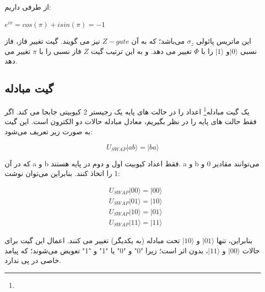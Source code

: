 \documentclass{book}
\begin{document}
از طرفی داریم:
\begin{center}
	$e^{i\pi} =  cos(\pi) + isin(\pi)= -1$
\end{center}
 این ماتریس پائولی $ \sigma_{z}$ می‌باشد؛ که به آن $ Z-gate$ نیز می گویند. گیت تغییر فاز، فاز نسبی
 $\vert 0 \rangle$و $\vert 1 \rangle$ را با $Φ$ تغییر می دهد. و به این ترتیب گیت $Z$ فاز نسبی را با $\pi$ تغییر می دهد. 
 
 
 
\subsection{گیت مبادله}
یک گیت مبادله\footnote{} اعداد را در حالت های پایه یک رجیستر 2 کیوبیتی جابجا می کند. اگر فقط حالت های پایه را در نظر بگیریم، معادل مبادله حالات دو الکترون است. این گیت به صورت  زیر تعریف می‌شود:
\begin{center}
\begin{equation}
	U_{SWAP}   \vert ab\rangle = \vert ba \rangle
\end{equation}
\end{center}
که در آن a و b فقط اعداد کیوبیت اول و دوم در پایه هستند. a و b می‌توانند مقادیر 0 و 1 را اتخاذ کنند. بنابراین می‌توان نوشت:
\begin{center}
	$$\begin{aligned}
		& U_{S W A P}|00\rangle=|00\rangle \\
		& U_{S W A P}|01\rangle=|10\rangle \\
		& U_{S W A P}|10\rangle=|01\rangle \\
		& U_{S W A P}|11\rangle=|11\rangle
	\end{aligned}$$
\end{center}




بنابراین، تنها $\vert 01 \rangle$ و $\vert 10 \rangle$ تحت مبادله (به یکدیگر) تغییر می کنند.
اعمال این گیت برای حالات $\vert 00 \rangle$ و $\vert 11 \rangle$، بدون اثر است؛ زیرا "0" و "0" یا "1" و "1" تعویض می‌شوند؛ که پیامد خاصی در پی ندارد.
\end{document}
